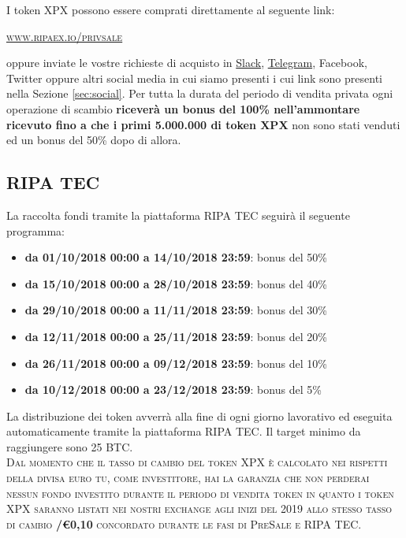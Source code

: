 \documentclass[11pt,fleqn]{book} %
\begin{document}
I token XPX possono essere comprati direttamente al seguente link:
\begin{center}
	\href{https://www.ripaex.io/privsale}{\textsc{www.ripaex.io/privsale}}
\end{center}

oppure inviate le vostre richieste di acquisto in
\href{https://join.slack.com/t/ripaex/shared_invite/enQtMzM4NzUwNjU4OTQ0LTY3MDJmMTdhYTNlZjJlNGUxNzM1YjUwYjgyYjZlMDJmOTg3NTIzNThmNTYyMGQ3ODBkOTRmYzk3Y2Y4MzBkOTY}{Slack}, 
\href{https://t.me/ripaex}{Telegram}, Facebook, Twitter oppure altri social media in cui siamo presenti
i cui link sono presenti nella Sezione \ref{sec:social}.
Per tutta la durata del periodo di vendita privata ogni operazione di scambio \textbf{riceverà un bonus
del 100\% nell'ammontare ricevuto fino a che i primi 5.000.000 di token XPX} non sono stati venduti ed un bonus
del 50\% dopo di allora.

\subsection{RIPA TEC}
La raccolta fondi tramite la piattaforma RIPA TEC seguirà il seguente programma:
\begin{itemize}
	\item \textbf{da 01/10/2018 00:00 a 14/10/2018 23:59}: bonus del 50\% 
	\item \textbf{da 15/10/2018 00:00 a 28/10/2018 23:59}: bonus del 40\% 
	\item \textbf{da 29/10/2018 00:00 a 11/11/2018 23:59}: bonus del 30\% 
	\item \textbf{da 12/11/2018 00:00 a 25/11/2018 23:59}: bonus del 20\% 
	\item \textbf{da 26/11/2018 00:00 a 09/12/2018 23:59}: bonus del 10\% 
	\item \textbf{da 10/12/2018 00:00 a 23/12/2018 23:59}: bonus del 5\% 
\end{itemize}
\vspace{5mm}
La distribuzione dei token avverrà alla fine di ogni giorno lavorativo ed eseguita automaticamente
tramite la piattaforma RIPA TEC. Il target minimo da raggiungere sono 25 BTC.\\

\textsc{Dal momento che il tasso di cambio del token XPX è calcolato nei rispetti della divisa euro tu, come investitore,
hai la garanzia che non perderai nessun fondo investito durante il periodo di vendita token in quanto i token XPX
saranno listati nei nostri exchange agli inizi del 2019 allo stesso tasso di cambio \textbf{\PHP/\euro0,10} 
concordato durante le fasi di PreSale e RIPA TEC}.\\
\end{document}
